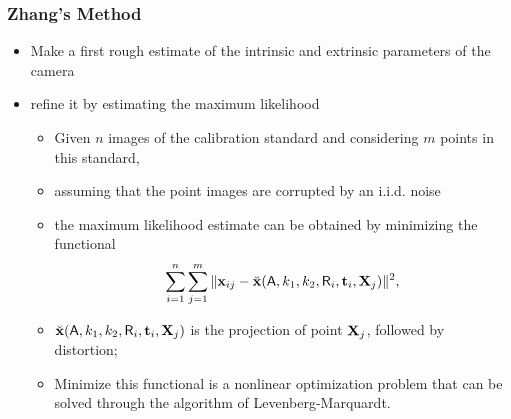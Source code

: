 \documentclass{beamer}
\begin{document}
		\begin{frame}
			\frametitle{Zhang's Method}
			\begin{itemize}
			 \item Make a first rough estimate of the intrinsic and extrinsic parameters of the camera
			 \item refine it by estimating the maximum likelihood
			 \begin{itemize}
			  \item Given $ n $ images of the calibration standard and considering $ m $ points in this standard,
			  \item assuming that the point images are corrupted by an i.i.d. noise
			  \item the maximum likelihood estimate can be obtained by minimizing the functional
			  \begin{equation*}
			    \sum_{i=1}^{n}\sum_{j=1}^{m} \Vert \mathbf{x}_{ij} - \breve{\mathbf{x}}(\mathsf{A}, k_1, k_2, \mathsf{R}_i, \mathbf{t}_i, \mathbf{X}_j) \Vert^2
			    \label{eq:functional},
			  \end{equation*}
				\item $\breve{\mathbf{x}}(\mathsf{A}, k_1, k_2, \mathsf{R}_i, \mathbf{t}_i, \mathbf{X}_j)$ is the projection of point $\mathbf{X}_j$, followed by distortion;
			  \item Minimize this functional is a nonlinear optimization problem that can be solved through the algorithm of Levenberg-Marquardt.
			 \end{itemize}
			\end{itemize}
		\end{frame}


\end{document}
